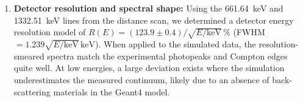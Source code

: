 \documentclass[11pt,a4paper]{article}
\begin{document}
\begin{enumerate}
  \item \textbf{Detector resolution and spectral shape:} Using the \SI{661.64}{keV} and \SI{1332.51}{keV} lines from the distance scan, we determined a detector energy resolution model of $R(E)=(123.9\pm0.4)/\sqrt{E/\mathrm{keV}}\,\%$ (FWHM $=1.239\sqrt{E/\mathrm{keV}}\,\mathrm{keV}$). When applied to the simulated data, the resolution-smeared spectra match the experimental photopeaks and Compton edges quite well. At low energies, a large deviation exists where the simulation underestimates the measured continuum, likely due to an absence of back-scattering materials in the Geant4 model.
\end{enumerate}
\end{document}
